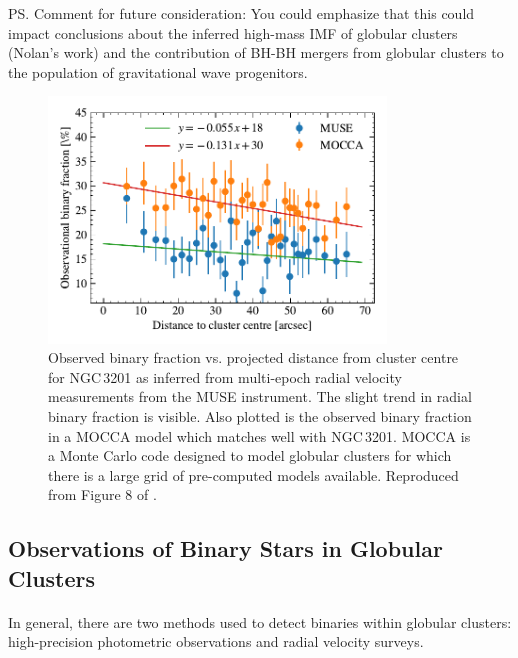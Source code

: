 \ps{Comment for future consideration: You could emphasize that this could impact conclusions about
	the inferred high-mass IMF of globular clusters (Nolan's work) and the contribution of BH-BH
	mergers from globular clusters to the population of gravitational wave progenitors.}


\begin{figure}
	\centering
	\includegraphics[width=0.8\textwidth]{figures/radial_binarity.pdf}
\caption{Observed binary fraction vs. projected distance from cluster centre for NGC\,3201 as
	inferred from multi-epoch radial velocity measurements from the MUSE instrument.
	The slight trend in radial binary fraction is visible. Also plotted is the observed
	binary fraction in a MOCCA model which matches well with NGC\,3201. MOCCA is a Monte
	Carlo code designed to model globular clusters for which there is a large grid of
	pre-computed models available. Reproduced from Figure 8 of \citet{Giesers2019}.}
	\label{fig:1/radial_binary_fraction}
\end{figure}

\subsection{Observations of Binary Stars in Globular Clusters}

\paragraph{}
In general, there are two methods used to detect binaries within globular clusters: high-precision
photometric observations and radial velocity surveys.

